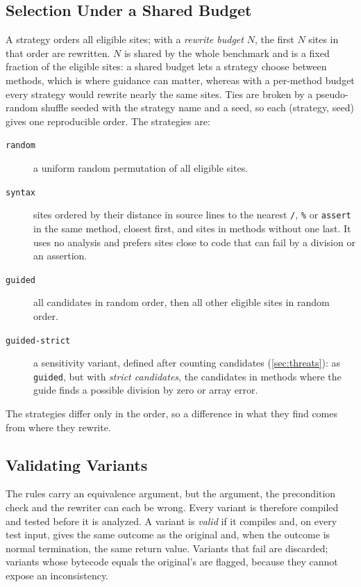 \subsection{Selection Under a Shared Budget}
\label{sec:selection}
A strategy orders all eligible sites; with a \emph{rewrite budget} $N$, the
first $N$ sites in that order are rewritten. $N$ is shared by the whole
benchmark and is a fixed fraction of the eligible sites: a shared budget lets a
strategy choose between methods, which is where guidance can matter, whereas
with a per-method budget every strategy would rewrite nearly the same sites.
Ties are broken by a pseudo-random shuffle seeded with the strategy name and a
seed, so each (strategy, seed) gives one reproducible order. The strategies are:
\begin{description}
  \item[\texttt{random}] a uniform random permutation of all eligible sites.
  \item[\texttt{syntax}] sites ordered by their distance in source lines to
    the nearest \texttt{/}, \texttt{\%} or \texttt{assert} in the same method,
    closest first, and sites in methods without one last. It uses no analysis
    and prefers sites close to code that can fail by a division or an
    assertion.
  \item[\texttt{guided}] all candidates in random order, then all other
    eligible sites in random order.
  \item[\texttt{guided-strict}] a sensitivity variant, defined after counting
    candidates (\cref{sec:threats}): as \texttt{guided}, but with
    \emph{strict candidates}, the candidates in methods where the guide finds
    a possible division by zero or array error.
\end{description}
The strategies differ only in the order, so a difference in what they find
comes from where they rewrite.

\subsection{Validating Variants}
\label{sec:validation}
The rules carry an equivalence argument, but the argument, the precondition
check and the rewriter can each be wrong. Every variant is therefore compiled
and tested before it is analyzed. A variant is \emph{valid} if it compiles and,
on every test input, gives the same outcome as the original and, when the
outcome is normal termination, the same return value. Variants that fail are
discarded; variants whose bytecode equals the original's are flagged, because
they cannot expose an inconsistency.

